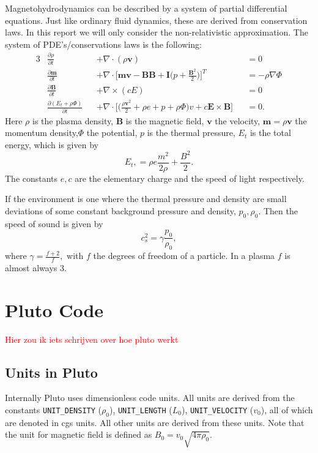 \documentclass[11pt]{article}
\begin{document}
Magnetohydrodynamics can be described by a system of partial differential equations. 
Just like ordinary fluid dynamics, these are derived from conservation laws. 
In this report we will only consider the non-relativistic approximation. 
The system of PDE's/conservations laws is the following:
\begin{alignat}{3}
    &\frac{\partial \rho}{\partial t} &&+ \nabla \cdot (\rho \mathbf v) &&= 0 \tag{mass}\label{masscont}\\
    &\frac{\partial \mathbf m}{\partial t} &&+  \nabla \cdot \bigg[\mathbf{mv - BB+ I}\bigg(p + \frac{\mathbf B^2}{2}\bigg)\bigg]^T &&= -\rho \nabla \Phi \tag{moment}\label{cauchymoment}\\
    &\frac{\partial \mathbf B}{\partial t} &&+ \nabla \times (cE) &&= 0 \tag{charge}\label{Faraday}\\
    &\frac{\partial(E_t + \rho \Phi)}{\partial t} &&+ \nabla \cdot \bigg[\bigg(\frac{\rho \mathbf v^2}{2} + \rho e + p + \rho \Phi\bigg)v + c \mathbf E \times \mathbf B\bigg] &&= 0 \tag{energy}\label{energy}.
\end{alignat}
Here $\rho$ is the plasma density, $\mathbf B$ is the magnetic field,  $\mathbf v$ the velocity, $\mathbf m= \rho \mathbf v$ the momentum density,$\Phi$ the potential, $p$ is the thermal pressure, $E_t$ is the total energy, which is given by \[
E_t, = \rho e \frac{m^2}{2\rho} + \frac{B^2}{2}
.\]  
The constants  $e, c$ are the elementary charge and the speed of light respectively.

If the environment is one where the thermal pressure and density are small deviations of some constant background pressure and density, $p_0, \rho_0$. Then the speed of sound is given by \[
c_s^2 = \gamma \frac{p_0}{\rho_0}
,\]
where $\gamma = \frac{f + 2}{f}, $ with $f$ the degrees of freedom of a particle. In a plasma $f$ is almost always $3$. 



\section{Pluto Code} \label{sec:pluto_code}

\textcolor{red}{Hier zou ik iets schrijven over hoe pluto werkt}

\subsection{Units in Pluto} \label{sec:units_in_pluto}

Internally Pluto uses dimensionless code units. All units are derived from the constants \texttt{UNIT\_DENSITY} ($\rho_0$), \texttt{UNIT\_LENGTH} ($L_0$), \texttt{UNIT\_VELOCITY} ($v_0$), all of which are denoted in cgs units. All other units are derived from these units.  
Note that the unit for magnetic field is defined as $B_0 = v_0\sqrt{4\pi \rho_0} $.
\end{document}
